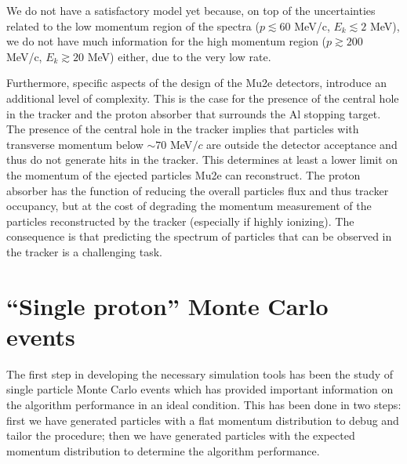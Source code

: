 \documentclass[12pt,a4paper,openright, oneside, titlepage]{book} %
\begin{document}
\noindent 
We do not have a satisfactory model yet because, 
on top of the uncertainties related to the low momentum region of the spectra
($p \lesssim 60$ MeV/c, $E_k \lesssim 2$ MeV), 
we do not have much information for the high momentum region ($p\gtrsim200$ MeV/c, $E_k\gtrsim 20$ MeV) either, due to the very low rate.

\noindent
Furthermore, specific aspects of the design of the Mu2e detectors, introduce an additional level of complexity. 
This is the case for the presence of the central hole in the tracker and the proton absorber that surrounds the Al stopping target.
The presence of the central hole in the tracker implies that particles with transverse momentum below $\sim70$ MeV$/c$ are outside the detector acceptance and thus do not generate hits in the tracker. 
This determines at least a lower limit on the momentum of the ejected particles Mu2e can reconstruct. 
The proton absorber has the function of reducing the overall particles flux and thus tracker occupancy, but at the cost of degrading the momentum measurement of the particles reconstructed by the tracker (especially if highly ionizing). 
The consequence is that predicting the spectrum of particles that can be observed in the tracker is a challenging task.

\section{``Single proton'' Monte Carlo events}
The first step in developing the necessary simulation tools has been the study of single particle Monte Carlo events which has provided important information on the algorithm performance in an ideal condition. 
This has been done in two steps: 
first we have generated particles with a flat momentum distribution to debug and tailor the procedure; 
then we have generated particles with the expected momentum distribution to determine the algorithm performance.
\end{document}
